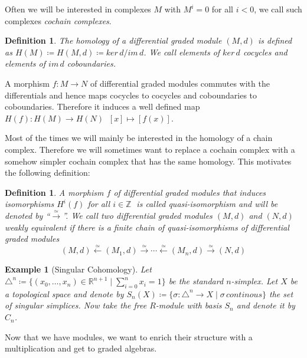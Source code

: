\documentclass[12pt,a4paper]{scrartcl}
\newtheorem{Definition}[Theorem]{Definition}
\newtheorem{Example}[Theorem]{Example}
\numberwithin{equation}{section}
\newcommand{\R}{\mathbb{R}} %
\newcommand{\Z}{\mathbb{Z}} %
\begin{document}
Often we will be interested in complexes $M$ with $M^i = 0$ for all $i < 0$, we call such complexes \emph{cochain complexes}.
\begin{Definition}
The \emph{homology} of a differential graded module $(M,d)$ is defined as \newline ${H(M) \coloneqq 
H(M,d) \coloneqq ker \, d / im \, d}$.
We call elements of $ker \, d$ \emph{cocycles} and elements of $im \, d$ \emph{coboundaries}.
\end{Definition}

A morphism $f \colon M \to N$ of differential graded modules commutes with the differentials and hence maps cocycles to cocycles
and coboundaries to coboundaries. Therefore it induces a well defined map $H(f) \colon H(M) \to H(N) \; \; [x] \mapsto [f(x)]$. 

Most of the times we will mainly be interested in the homology of a chain complex. Therefore we will sometimes want to replace
a cochain complex with a somehow simpler cochain complex that has the same homology. This motivates the following definition:

\begin{Definition}
 A morphism $f$ of differential graded modules that induces isomorphisms $H^i(f)$ for all $i \in \Z \;$ is called \emph{quasi-isomorphism} and will
 be denoted by ``$\overset{\simeq}{\longrightarrow}$''. \newline
 We call two differential graded modules $(M,d)$ and $(N,d)$ \emph{weakly equivalent} if there is a finite chain of quasi-isomorphisms of differential
 graded modules
 $$ (M,d) \overset{\simeq}{\leftarrow} (M_1,d) \overset{\simeq}{\rightarrow} \cdots 
 \overset{\simeq}{\leftarrow} (M_n,d) \overset{\simeq}{\rightarrow} (N,d)$$
\end{Definition}

\begin{Example}[Singular Cohomology]
 Let $\triangle^n \coloneqq {\lbrace (x_0, \dotsc , x_n) \in \R^{n+1} \; | \; \sum_{i = 0}^n x_i = 1\rbrace}$ be the standard
 $n$-simplex. Let $X$ be a topological space and denote by
 $S_n(X) \coloneqq {\lbrace \sigma \colon \triangle^n \to X \; | \; \sigma \, continous \rbrace}$ the set of
 \emph{singular simplices}. Now take the free $R$-module with basis $S_n$ and denote it by $C_n$.
 
 
\end{Example}

Now that we have modules, we want to enrich their structure with a multiplication and get to graded algebras.
\end{document}

